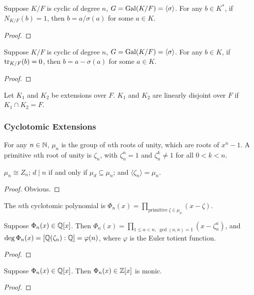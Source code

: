 \begin{theorem}
    Suppose \(K/F\) is cyclic of degree \(n\), \(G = \operatorname{Gal}(K/F) = \langle\sigma\rangle\).
    For any \(b \in K^\ast\), if \(N_{K/F}(b) = 1\),
    then \(b = a/\sigma(a)\) for some \(a \in K\).
\end{theorem}
\begin{proof}
\end{proof}
\begin{theorem}
    Suppose \(K/F\) is cyclic of degree \(n\), \(G = \operatorname{Gal}(K/F) = \langle\sigma\rangle\).
    For any \(b \in K\), if \(\tr_{K/F}(b) = 0\),
    then \(b = a - \sigma(a)\) for some \(a \in K\).
\end{theorem}
\begin{proof}
\end{proof}

\begin{definition}
    Let \(K_1\) and \(K_2\) be extensions over \(F\).
    \(K_1\) and \(K_2\) are linearly disjoint over \(F\)
    if \(K_1 \cap K_2 = F\).
\end{definition}

\subsubsection*{Cyclotomic Extensions}

\begin{definition}
    For any \(n \in \mathbb{N}\), \(\mu_n\) is the group of \(n\)th roots of unity,
    which are roots of \(x^n - 1\).
    A primitive \(n\)th root of unity is \(\zeta_n\),
    with \(\zeta_n^n = 1\) and \(\zeta_n^k \neq 1\) for all \(0 < k < n\).
\end{definition}
\begin{proposition}
    \(\mu_n \cong Z_n\);
    \(d \mid n\) if and only if \(\mu_d \subseteq \mu_n\);
    and \(\langle \zeta_n \rangle = \mu_n\).
\end{proposition}
\begin{proof}
    Obvious.
\end{proof}

\begin{definition}
    The \(n\)th cyclotomic polynomial is
    \(\Phi_n(x) = \prod_{\text{primitive}\;\zeta\in\mu_n} (x-\zeta)\).
\end{definition}
\begin{proposition}
    Suppose \(\Phi_n(x) \in \mathbb{Q}[x]\).
    Then \(\Phi_n(x)  = \prod_{1 \leq a < n,\; \gcd(a,n) = 1} (x-\zeta_n^a)\),
    and \(\deg \Phi_n(x) = [\mathbb{Q}(\zeta_n):\mathbb{Q}] = \varphi(n)\),
    where \(\varphi\) is the Euler totient function.
\end{proposition}
\begin{proof}
\end{proof}
\begin{proposition}
    Suppose \(\Phi_n(x) \in \mathbb{Q}[x]\).
    Then \(\Phi_n(x) \in \mathbb{Z}[x]\) is monic.
\end{proposition}
\begin{proof}
\end{proof}


